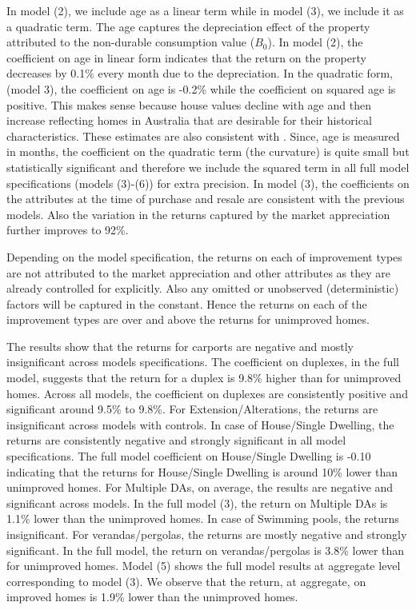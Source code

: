 \documentclass[AEJ,reqno, draftmode]{AEA} %
\begin{document}
In model (2), we include age as a linear term while in model (3), we include it as a quadratic term. The age captures the depreciation effect of the property attributed to the non-durable consumption value ($B_0$). In model (2), the coefficient on age in linear form indicates that the return on the property decreases by 0.1\% every month due to the depreciation. In the quadratic form, (model 3), the coefficient on age is -0.2\% while the coefficient on squared age is positive. This makes sense because house values decline with age and then increase reflecting homes in Australia that are desirable for their historical characteristics. These estimates are also consistent with \citep{kiel1995effect}. Since, age is measured in months, the coefficient on the quadratic term (the curvature) is quite small but statistically significant and therefore we include the squared term in all full model specifications (models (3)-(6)) for extra precision. In model (3), the coefficients on the attributes at the time of purchase and resale are consistent with the previous models. Also the variation in the returns captured by the market appreciation further improves to 92\%.

Depending on the model specification, the returns on each of improvement types are not attributed to the market appreciation and other attributes as they are already controlled for explicitly. Also any omitted or unobserved (deterministic) factors will be captured in the constant. Hence the returns on each of the improvement types are over and above the returns for unimproved homes. 


\restoregeometry

The results show that the returns for carports are negative and mostly insignificant across models specifications. The coefficient on duplexes, in the full model, suggests that the return for a duplex is 9.8\% higher than for unimproved homes. Across all models, the coefficient on duplexes are consistently positive and significant around 9.5\% to 9.8\%. For Extension/Alterations, the returns are insignificant across models with controls. In case of House/Single Dwelling, the returns are consistently negative and strongly significant in all model specifications. The full model coefficient on House/Single Dwelling is -0.10 indicating that the returns for House/Single Dwelling is around 10\% lower than unimproved homes. For Multiple DAs, on average, the results are negative and significant across models. In the full model (3), the return on Multiple DAs is 1.1\% lower than the unimproved homes. In case of Swimming pools, the returns insignificant. For verandas/pergolas, the returns are mostly negative and strongly significant. In the full model, the return on verandas/pergolas is 3.8\% lower than for unimproved homes. Model (5) shows the full model results at aggregate level corresponding to model (3). We observe that the return, at aggregate, on improved homes is 1.9\% lower than the unimproved homes.
\end{document}
